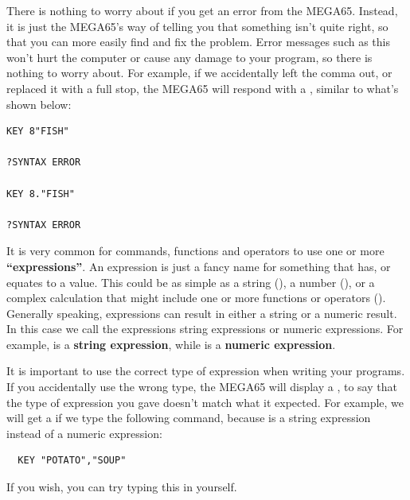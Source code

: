 There is nothing to worry about if you get an error from the MEGA65.
Instead, it is just the MEGA65's way of telling you that something
isn't quite right, so that you can more easily
find and fix the problem.
Error messages such as this won't hurt the computer or cause any damage to your program,
so there is nothing to worry about.
For example, if we accidentally left the comma out, or replaced it with
a full stop, the MEGA65 will respond with
a , similar to what's shown below:

\newpage
\begin{tcolorbox}[colback=black,coltext=white]
\verbatimfont{\codefont}
\begin{verbatim}
KEY 8"FISH"

?SYNTAX ERROR

KEY 8."FISH"

?SYNTAX ERROR
\end{verbatim}
\end{tcolorbox}


It is very common for commands, functions and operators to use one or
more {\bf``expressions''}.
An expression is just a fancy name for something that has, or equates to a value.
This could be as simple as a string (), a number
(), or a complex calculation that might include
one or more functions or operators ().
Generally speaking, expressions can result in either a string or a numeric result.
In this case we call the expressions string expressions or numeric expressions.
For example,  is a {\bf string expression}, while
 is a {\bf numeric expression}.

It is important to use the correct type of expression when writing your programs.
If you accidentally use the wrong type, the MEGA65 will display a
, to say that the type
of expression you gave doesn't match what it expected. For example, we will get a
 if we type the following command,
because  is a string expression instead of a numeric expression:

\begin{tcolorbox}[colback=black,coltext=white]
\verbatimfont{\codefont}
\begin{verbatim}
  KEY "POTATO","SOUP"
\end{verbatim}
\end{tcolorbox}

If you wish, you can try typing this in yourself.

